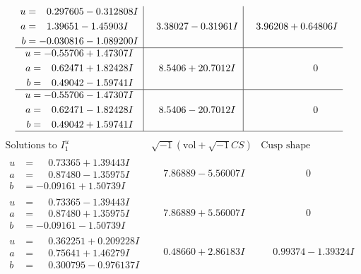 \documentclass[1p]{elsarticle_modified}
\theoremstyle{definition}
\newcommand{\I}{\sqrt{-1}}
\begin{document}
$$\begin{array}{c|c|c}
\begin{aligned}
u &= \phantom{-}0.297605 - 0.312808 I \\
a &= \phantom{-}1.39651 - 1.45903 I \\
b &= -0.030816 - 1.089200 I\end{aligned}
 & \phantom{-}3.38027 - 0.31961 I & \phantom{-}3.96208 + 0.64806 I \\ \hline\begin{aligned}
u &= -0.55706 + 1.47307 I \\
a &= \phantom{-}0.62471 + 1.82428 I \\
b &= \phantom{-}0.49042 - 1.59741 I\end{aligned}
 & \phantom{-}8.5406 + 20.7012 I & \phantom{-0.000000 } 0 \\ \hline\begin{aligned}
u &= -0.55706 - 1.47307 I \\
a &= \phantom{-}0.62471 - 1.82428 I \\
b &= \phantom{-}0.49042 + 1.59741 I\end{aligned}
 & \phantom{-}8.5406 - 20.7012 I & \phantom{-0.000000 } 0\\
 \hline 
 \end{array}$$\newpage$$\begin{array}{c|c|c}  
\text{Solutions to }I^u_{1}& \I (\text{vol} + \sqrt{-1}CS) & \text{Cusp shape}\\
 \hline 
\begin{aligned}
u &= \phantom{-}0.73365 + 1.39443 I \\
a &= \phantom{-}0.87480 - 1.35975 I \\
b &= -0.09161 + 1.50739 I\end{aligned}
 & \phantom{-}7.86889 - 5.56007 I & \phantom{-0.000000 } 0 \\ \hline\begin{aligned}
u &= \phantom{-}0.73365 - 1.39443 I \\
a &= \phantom{-}0.87480 + 1.35975 I \\
b &= -0.09161 - 1.50739 I\end{aligned}
 & \phantom{-}7.86889 + 5.56007 I & \phantom{-0.000000 } 0 \\ \hline\begin{aligned}
u &= \phantom{-}0.362251 + 0.209228 I \\
a &= \phantom{-}0.75641 + 1.46279 I \\
b &= \phantom{-}0.300795 - 0.976137 I\end{aligned}
 & \phantom{-}0.48660 + 2.86183 I & \phantom{-}0.99374 - 1.39324 I \\ \hline\begin{aligned}

\end{aligned}
\end{array}$$
\end{document}
